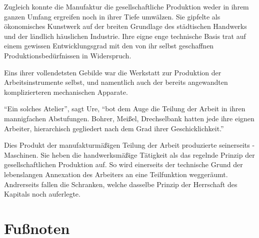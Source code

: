 {Zugleich konnte die Manufaktur die gesellschaftliche Produktion weder in
ihrem ganzen Umfang ergreifen noch in ihrer Tiefe umwälzen. Sie gipfelte
als ökonomisches Kunstwerk auf der breiten Grundlage des städtischen
Handwerks und der ländlich häuslichen Industrie. Ihre eigne enge
technische Basis trat auf einem gewissen Entwicklungsgrad mit den von
ihr selbst geschaffnen Produktionsbedürfnissen in Widerspruch.

Eins ihrer vollendetsten Gebilde war die Werkstatt zur Produktion der
Arbeitsinstrumente selbst, und namentlich auch der bereits angewandten
komplizierteren mechanischen Apparate.

``Ein solches Atelier'', sagt Ure, ``bot dem Auge die Teilung der Arbeit
in ihren mannigfachen Abstufungen. Bohrer, Meißel, Drechselbank hatten
jede ihre eignen Arbeiter, hierarchisch gegliedert nach dem Grad ihrer
Geschicklichkeit.''

Dies Produkt der manufakturmäßigen Teilung der Arbeit produzierte
seinerseits - Maschinen. Sie heben die handwerksmäßige Tätigkeit als das
regelnde Prinzip der gesellschaftlichen Produktion auf. So wird
einerseits der technische Grund der lebenslangen Annexation des
Arbeiters an eine Teilfunktion weggeräumt. Andrerseits fallen die
Schranken, welche dasselbe Prinzip der Herrschaft des Kapitals noch
auferlegte.

{%
\section{Fußnoten}\label{fuuxdfnoten}}

}
